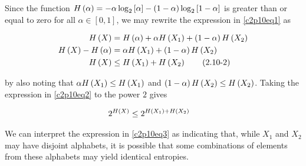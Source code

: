 \documentclass[ClusteringConnectionsMAIN.tex]{subfiles}
\begin{document}
	

  Since the function $H \left(  \alpha  \right) = - \alpha \log_2 \left[ \alpha \right] - \left( 1 - \alpha \right) \log_2 \left[ 1 - \alpha \right]$ is greater than or equal to zero for all $\alpha \in \left[0, 1 \right]$, we may rewrite the expression in \ref{c2p10eq1} as

\begin{align}  \label{c2p10eq2}
H \left( X \right) &= H \left( \alpha \right) + \alpha H \left( X_1 \right) + \left( 1 - \alpha \right) H \left( X_2 \right)    \notag \\
H \left( X \right) - H \left( \alpha \right) &= \alpha H \left( X_1 \right) + \left( 1 - \alpha \right) H \left( X_2 \right)   \notag \\
H \left( X \right) &\leq H \left( X_1 \right) + H \left( X_2 \right) \tag{2.10-2}
\end{align}

by also noting that $ \alpha H \left( X_1 \right) \leq H \left( X_1 \right)$ and $\left( 1 - \alpha \right) H \left( X_2 \right) \leq H \left( X_2 \right)$.  Taking the expression in \ref{c2p10eq2} to the power $2$ gives

\begin{align}  \label{c2p10eq3}
2^{H \left( X \right)} &\leq 2^{H \left( X_1 \right) + H \left( X_2 \right)} 
\end{align}

We can interpret the expression in \ref{c2p10eq3} as indicating that, while $X_1$ and $X_2$ may have disjoint alphabets, it is possible that some combinations of elements from these alphabets may yield identical entropies.
\end{document}
